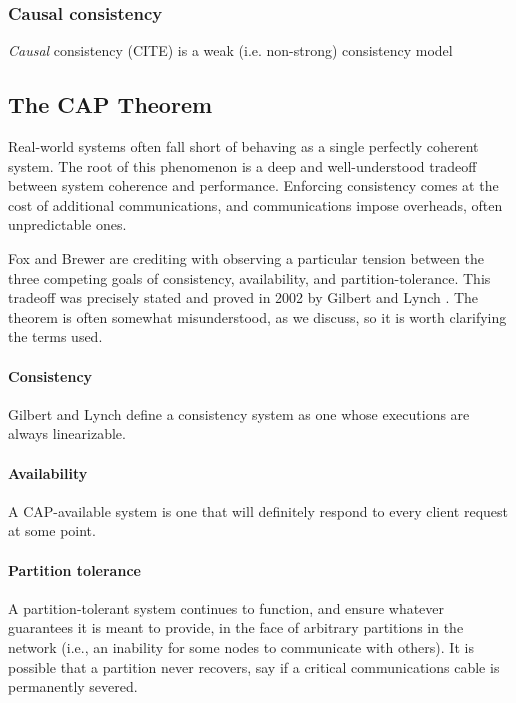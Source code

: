 \documentclass[]             %
{NASA}                       %
\theoremstyle{definition}
\begin{document}
\subsubsection{Causal consistency}
\label{causal-consistency}

\emph{Causal} consistency (CITE) is a weak (i.e. non-strong)
consistency model


\subsection{The CAP Theorem}
\label{the-cap-theorem}

Real-world systems often fall short of behaving as a single perfectly
coherent system. The root of this phenomenon is a deep and
well-understood tradeoff between system coherence and performance.
Enforcing consistency comes at the cost of additional communications,
and communications impose overheads, often unpredictable ones.

Fox and Brewer \cite{1999foxbrewer} are crediting with observing a
particular tension between the three competing goals of consistency,
availability, and partition-tolerance. This tradeoff was precisely
stated and proved in 2002 by Gilbert and Lynch
\cite{2002gilbertlynchCAP}.  The theorem is often somewhat
misunderstood, as we discuss, so it is worth clarifying the terms
used.

\paragraph{Consistency}

Gilbert and Lynch define a consistency system as one whose executions
are always linearizable.

\paragraph{Availability}

A CAP-available system is one that will definitely respond to every
client request at some point.

\paragraph{Partition tolerance}

A partition-tolerant system continues to function, and ensure whatever
guarantees it is meant to provide, in the face of arbitrary partitions
in the network (i.e., an inability for some nodes to communicate with
others). It is possible that a partition never recovers, say if a
critical communications cable is permanently severed.
\end{document}
